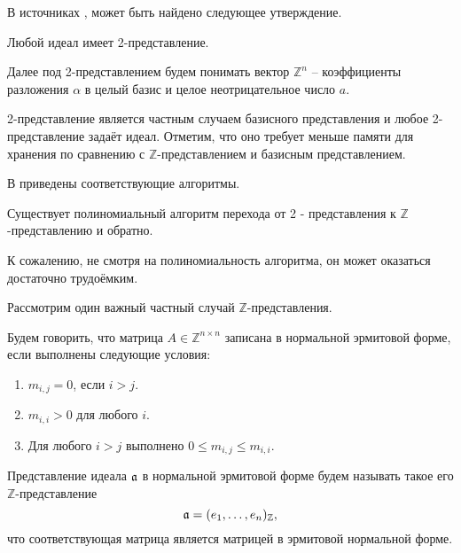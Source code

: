 \documentclass[_00_dissertation.tex]{subfiles}
\begin{document}
В источниках \cite{Cohen}, \cite{Post} может быть найдено следующее утверждение.

\begin{statement}
    Любой идеал имеет 2-представление.
\end{statement}

Далее под 2-представлением будем понимать вектор $\mathbb{Z}^n$ -- коэффициенты разложения $\alpha$ в целый базис и целое неотрицательное число $a$.

2-представление является частным случаем базисного представления и любое 2-представление задаёт идеал. Отметим, что оно требует меньше памяти для хранения по сравнению с $\mathbb{Z}$-представлением и базисным представлением.   

В \cite{Post} приведены соответствующие алгоритмы.

\begin{statement}
    Существует полиномиальный алгоритм перехода от 2 - представления к $\mathbb{Z}$-представлению и обратно.
\end{statement}

К сожалению, не смотря на полиномиальность алгоритма, он может оказаться достаточно трудоёмким.

Рассмотрим один важный частный случай $\mathbb{Z}$-представления.

\begin{definition}
    Будем говорить, что матрица $A \in \mathbb{Z}^{n \times n}$ записана в нормальной эрмитовой форме, если выполнены следующие условия:
	
    \begin{enumerate}
        \item $m_{i,j} = 0$, если $i > j$.
        
        \item $m_{i,i} > 0$ для любого $i$.
        
        \item Для любого $i > j$ выполнено $0\leq m_{i,j}\leq m_{i,i}$.
    \end{enumerate}
\end{definition}

\begin{definition}
    Представление идеала $\mathfrak{a}$ в нормальной эрмитовой форме будем называть такое его $\mathbb{Z}$-представление
    \begin{equation}
        \mathfrak{a} = (e_1,\dots,e_n)_{\mathbb{Z}},
    \end{equation}
    что соответствующая матрица является матрицей в эрмитовой нормальной форме.
\end{definition}
\end{document}
